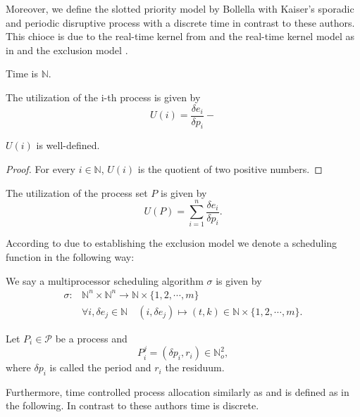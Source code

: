 Moreover, we define the slotted priority model by Bollella with Kaiser's sporadic and periodic disruptive process with a discrete time in contrast to these authors.
This chioce is due to the real-time kernel from \cite{PROSA_schedubility_analysis} and the real-time kernel model as in \cite[chp. 5.3]{B97} and the exclusion model \cite[p.12]{B97}.

\begin{definition}
	Time is $\mathbb{N}$.
\end{definition}


\begin{definition}
	The utilization of the i-th process is given by 
	\begin{equation} 
	U(i) = \frac{\delta e_i}{\delta p_i}- 
	\end{equation}
\end{definition}
\begin{lemma}
$U(i)$ is well-defined.
\end{lemma}
\begin{proof}
For every $i\in \mathbb{N}$, $U(i)$ is the quotient of two positive numbers.
\end{proof}

\begin{definition}
The utilization of the process set $P$ is given by 
	\begin{equation}
	U(P)= \sum_{i=1}^n \frac{\delta e_i}{\delta p_i}.
	\end{equation}
\end{definition}

According to \cite{B97} due to establishing the exclusion model we denote  a scheduling function in the following way:

\begin{definition}
We say a multiprocessor scheduling algorithm $\sigma$ is given by 
	\begin{align} 
	\sigma: &\mathbb{N}^n \times \mathbb{N}^n \longrightarrow  \mathbb{N} \times \{1,2,\cdots, m\} \\
	&\forall i, \delta e_j \in  \mathbb{N} \quad (i ,\delta e_j)  \mapsto (t,k) \in \mathbb{N}\times \{1,2,\cdots,m\}. 
	\end{align}
\end{definition}


\begin{definition}
Let $P_i\in \mathcal{P}$ be a process and 
\begin{equation}
P^j_i = ( \delta p_i, r_i) \in \mathbb{N}_o^2,  
\end{equation}
where $\delta p_i$ is called the period and $r_i$ the residuum. 
\end{definition}
Furthermore, time controlled process allocation similarly as \cite{B97} and \cite[p. 34]{K} is defined as in the following. In contrast to these authors time is discrete.

